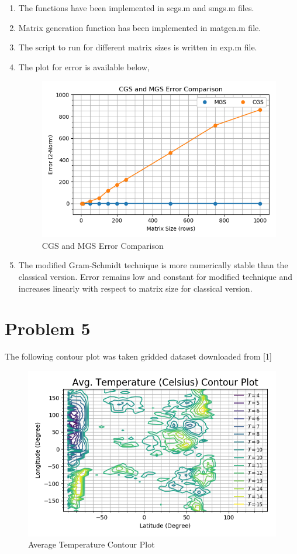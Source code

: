 \documentclass[12pt,letterpaper]{article}
\begin{document}
\begin{enumerate}
	\item The functions have been implemented in scgs.m and smgs.m files.
	\item Matrix generation function has been implemented in matgen.m file.
	\item The script to run for different matrix sizes is written in exp.m file.
	\item The plot for error is available below,
	\begin{figure}[!h]
		\centering
		\includegraphics[width=0.9\linewidth]{1.png}
		\caption{CGS and MGS Error Comparison}
	\end{figure}
	\item The modified Gram-Schmidt technique is more numerically stable than the classical version. Error remains low and constant for modified technique and increases linearly with respect to matrix size for classical version.
\end{enumerate}

\section*{Problem 5}

The following contour plot was taken gridded dataset downloaded from [1]

\begin{figure}[!h]
	\centering
	\includegraphics[width=0.9\linewidth]{2.png}
	\caption{Average Temperature Contour Plot}
\end{figure}
  
\end{document}
